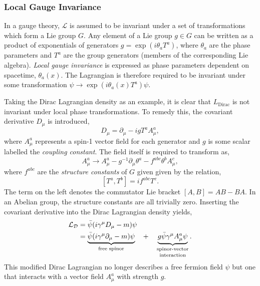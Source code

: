 \subsubsection{Local Gauge Invariance}

In a gauge theory, $\mathcal{L}$ is assumed to be invariant under a set of transformations which form a Lie group $G$.
Any element of a Lie group $g \in G$ can be written as a product of exponentials of generators $g = \exp(i \theta_a T^a)$, where $\theta_a$ are the phase parameters and $T^a$ are the group generators (members of the corresponding Lie algebra).
\textit{Local gauge invariance} is expressed as phase parameters dependent on spacetime, $\theta_a(x)$.
The Lagrangian is therefore required to be invariant under some transformation $\psi \rightarrow \exp\left(i \theta_a(x) T^a\right) \psi$.

Taking the Dirac Lagrangian density as an example, it is clear that $L_\text{Dirac}$ is not invariant under local phase transformations.
To remedy this, the covariant derivative $D_\mu$ is introduced,
\begin{equation}
	\label{eq:covariant_derivative}
	D_\mu = \partial_\mu - i g T^a A_\mu^a,
\end{equation}
where $A_\mu^a$ represents a spin-1 vector field for each generator and $g$ is some scalar labelled the \textit{coupling constant}.
The field itself is required to transform as,
\begin{equation}
	\label{eq:gauge_transformation}
	A_\mu^a \rightarrow A_\mu^a - g^{-1} \partial_\mu \theta^a - f^{abc} \theta^b A_\mu^c,
\end{equation}
where $f^{abc}$ are the \textit{structure constants} of $G$ given given by the relation,
\begin{equation}
	\label{eq:structure_constants}
	[T^a, T^b] = i f^{abc} T^c.
\end{equation}
The term on the left denotes the commutator Lie bracket $[A, B] = AB - BA$.
In an Abelian group, the structure constants are all trivially zero.
Inserting the covariant derivative into the Dirac Lagrangian density yields,
\begin{align}
	\label{eq:dirac_lagrangian_gauge}
	\mathcal{L_D} & = \bar \psi (i \gamma^\mu D_\mu - m) \psi                                                                                                                                       \\
	              & = \underbrace{\bar \psi (i \gamma^\mu \partial_\mu - m) \psi}_\text{free spinor} \quad + \quad \underbrace{g \bar \psi \gamma^\mu A_\mu^a \psi}_\text{\shortstack{spinor-vector \\interaction}}.
\end{align}
This modified Dirac Lagrangian no longer describes a free fermion field $\psi$ but one that interacts with a vector field $A_\mu^a$ with strength $g$.

